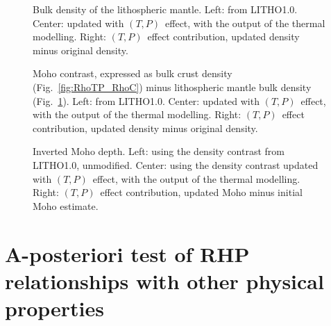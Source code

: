 \begin{subappendices}
\begin{figure}
	\begin{adjustbox}{center}
	\end{adjustbox}
	\caption[Bulk density of the lithospheric mantle, effect of temperature dependence.]{Bulk density of the lithospheric mantle.
	Left: from LITHO1.0.
	Center: updated with $(T,P)$~effect, with the output of the thermal modelling.
	Right: $(T,P)$~effect contribution, updated density minus original density.}
	\label{fig:RhoTP_RhoM}
\end{figure}

\begin{figure}
	\begin{adjustbox}{center}
	\end{adjustbox}
	\caption[Moho contrast, effect of temperature dependence.]{Moho contrast, expressed as bulk crust density (Fig.~\ref{fig:RhoTP_RhoC}) minus lithospheric mantle bulk density (Fig.~\ref{fig:RhoTP_RhoM}).
	Left: from LITHO1.0.
	Center: updated with $(T,P)$~effect, with the output of the thermal modelling. Right: $(T,P)$~effect contribution, updated density minus original density.}
	\label{fig:RhoTP_MohoContrast}
\end{figure}

\begin{figure}
	\begin{adjustbox}{center}
	\end{adjustbox}
	\caption[Inverted Moho depth, effect of temperature dependence.]{Inverted Moho depth.
	Left: using the density contrast from LITHO1.0, unmodified.
	Center: using the density contrast updated with $(T,P)$~effect, with the output of the thermal modelling.
	Right: $(T,P)$~effect contribution, updated Moho minus initial Moho estimate.}
	\label{fig:RhoTP_MohoDepth}
\end{figure}

\FloatBarrier

\section[
	tocentry={A-posteriori test of heat production relationships},
	head={A-posteriori test of RHP relationships with other physical properties}]{A-posteriori test of RHP relationships with other physical properties}
\label{s:ApplSup:Rel}


\end{subappendices}
